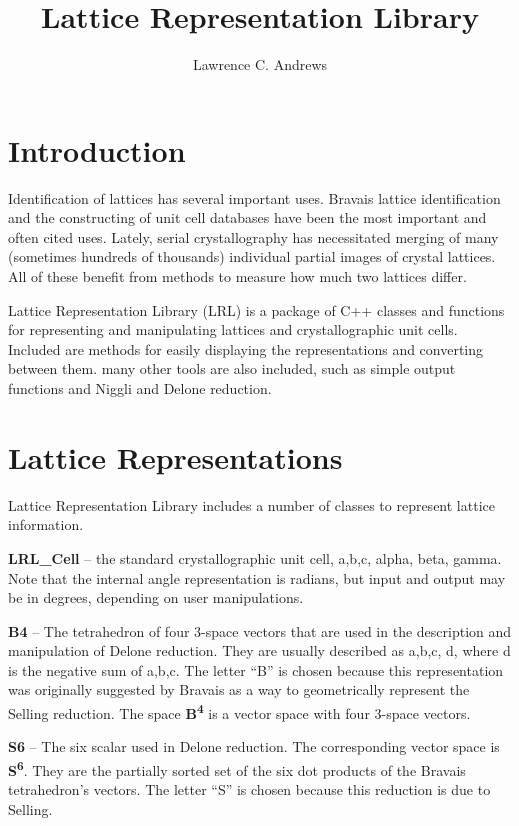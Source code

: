 \documentclass[11pt]{article} %
\title{Lattice Representation Library}
\author{Lawrence C. Andrews}
\begin{document}
\maketitle
\tableofcontents

\section{Introduction}

Identification of lattices has several important uses. Bravais lattice identification and the constructing of unit cell databases have been the most important and often cited uses. Lately, serial crystallography has necessitated merging of many (sometimes hundreds of thousands) individual partial images of crystal lattices. All of these benefit from methods to measure how much two lattices differ.

Lattice Representation Library (LRL) is a package of C++ classes and functions for representing and manipulating lattices and crystallographic unit cells. Included are methods for easily displaying the representations and converting between them. many other tools are also included, such as simple output functions and Niggli and Delone reduction.

\section{Lattice Representations}

Lattice Representation Library includes a number of classes to represent lattice information.

\textbf{LRL\_Cell} – the standard crystallographic unit cell, a,b,c, alpha, beta, gamma. Note that the internal angle representation is radians, but input and output may be in degrees, depending on user manipulations.

\textbf{B4} – The tetrahedron of four 3-space vectors that are used in the description and manipulation of Delone reduction. They are usually described as a,b,c, d, where d is the negative sum of a,b,c. The letter “B” is chosen because this representation was originally suggested by Bravais as a way to geometrically represent the Selling reduction. The space \textbf{B\textsuperscript{4}} is a vector space with four 3-space vectors.

\textbf{S6} – The six scalar used in Delone reduction. The corresponding vector space is \textbf{S\textsuperscript{6}}. They are the partially sorted set of the six dot products of the Bravais tetrahedron’s vectors. The letter “S” is chosen because this reduction is due to Selling.
\end{document}
